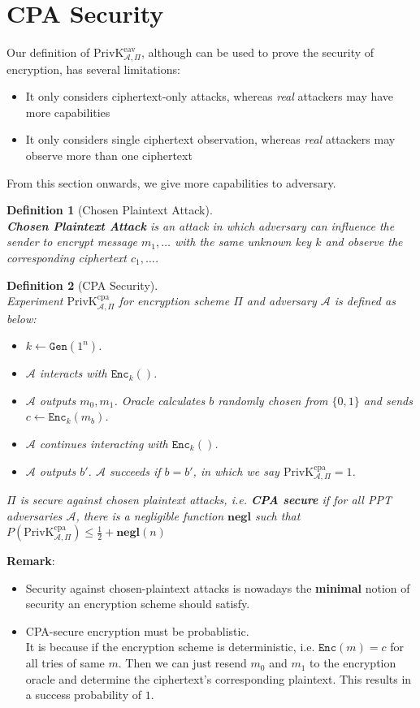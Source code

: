 \documentclass[12pt]{article}
\newcommand\PrivK{\mathrm{PrivK}}
\newtheorem{definition}{Definition}[section]
\theoremstyle{definition}
\begin{document}
\section{CPA Security}
Our definition of $\PrivK _{\mathcal{A},\Pi}^\text{eav}$, although can be used to prove the security of encryption, has several limitations:
\begin{itemize}
  \item It only considers ciphertext-only attacks, whereas \textit{real} attackers may have more capabilities
  \item It only considers single ciphertext observation, whereas \textit{real} attackers may observe more than one ciphertext
\end{itemize}
From this section onwards, we give more capabilities to adversary.
\begin{definition}[Chosen Plaintext Attack]
\hfill\\\normalfont \textbf{Chosen Plaintext Attack} is an attack in which adversary can influence the sender to encrypt message $m_1,\ldots$ with the \textit{same} unknown key $k$ and observe the corresponding ciphertext $c_1,\ldots$.
\end{definition}
\begin{definition}[CPA Security]
\hfill\\\normalfont Experiment $\PrivK_{\mathcal{A},\Pi}^\text{cpa}$ for encryption scheme $\Pi$ and adversary $\mathcal{A}$ is defined as below:
\begin{itemize}
  \item $k\leftarrow \texttt{Gen}(1^n)$.
  \item $\mathcal{A}$ interacts with $\texttt{Enc}_k()$.
  \item $\mathcal{A}$ outputs $m_0, m_1$. Oracle calculates $b$ randomly chosen from $\{0,1\}$ and sends $c\leftarrow \texttt{Enc}_k(m_b)$.
  \item $\mathcal{A}$ continues interacting with $\texttt{Enc}_k()$.
  \item $\mathcal{A}$ outputs $b'$. $\mathcal{A}$ succeeds if $b=b'$, in which we say $\PrivK_{\mathcal{A},\Pi}^\text{cpa}=1$.
\end{itemize}
$\Pi$ is secure against chosen plaintext attacks, i.e. \textbf{CPA secure} if for all PPT adversaries $\mathcal{A}$, there is a negligible function $\mathbf{negl}$ such that
$
P(\PrivK_{\mathcal{A},\Pi}^\text{cpa})\leq \frac{1}{2}+\mathbf{negl}(n)
$
\end{definition}
\textbf{Remark}:\\ 
\begin{itemize}
  \item Security against chosen-plaintext attacks is nowadays the \textbf{minimal} notion of security an encryption scheme should satisfy.\\
  \item CPA-secure encryption must be probablistic. \\It is because if the encryption scheme is deterministic, i.e. $\texttt{Enc}(m)=c$ for all tries of same $m$. Then we can just resend $m_0$ and $m_1$ to the encryption oracle and determine the ciphertext's corresponding plaintext. This results in a success probability of $1$.
\end{itemize}
\end{document}
